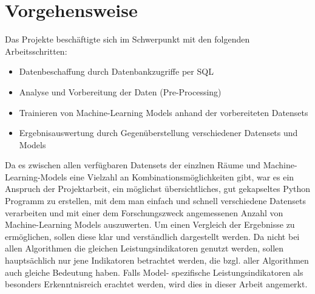 


\newpage

\section{Vorgehensweise}


Das Projekte beschäftigte sich im Schwerpunkt mit den folgenden Arbeitsschritten:
\begin{itemize}
    \item Datenbeschaffung durch Datenbankzugriffe per SQL
    \item Analyse und Vorbereitung der Daten (Pre-Processing)
    \item Trainieren von Machine-Learning Models anhand der vorbereiteten Datensets
    \item Ergebnisauswertung durch Gegenüberstellung verschiedener Datensets und Models
\end{itemize}
Da es zwischen allen verfügbaren Datensets der einzlnen Räume und Machine-Learning-Models eine Vielzahl an
Kombinationsmöglichkeiten gibt, war es ein Anspruch der Projektarbeit, ein möglichst übersichtliches, 
gut gekapseltes Python Programm zu erstellen, mit dem man einfach und schnell verschiedene Datensets  
verarbeiten und mit einer dem Forschungszweck angemessenen Anzahl von Machine-Learning Models auszuwerten. 
Um einen Vergleich der Ergebnisse zu ermöglichen, sollen diese klar und verständlich dargestellt werden. 
Da nicht bei allen Algorithmen die gleichen Leistungsindikatoren genutzt werden, sollen hauptsächlich nur 
jene Indikatoren betrachtet werden, die bzgl. aller Algorithmen auch gleiche Bedeutung haben. Falls Model-
spezifische Leistungsindikatoren als besonders Erkenntnisreich erachtet werden, wird dies in dieser Arbeit
angemerkt.